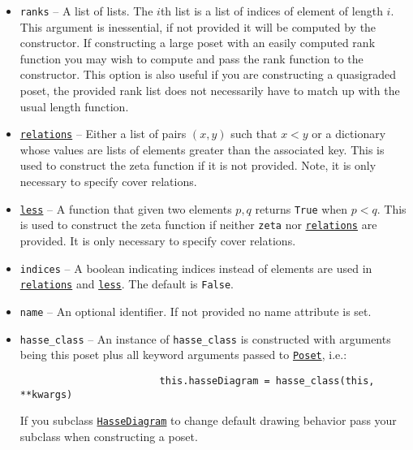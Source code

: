 \documentclass[12pt]{article}
\begin{document}
{{\begin{itemize}
{                The default value is \verb|[0,...,len(zeta)-1]|
                Note, the list will be reordered into a linear extension as this is necessary to store the zeta function as a triangular array.
        }
        \item[]{
        \verb|ranks| -- A list of lists. The $i$th list is a list of indices of element of
                length $i$. This argument is inessential, if not provided it will be computed by the constructor.
                If constructing a large poset with an easily computed
                rank function you may wish to compute and pass the
                rank function to the constructor. This
                option is also useful if you are constructing
                a quasigraded poset, the provided rank list
                does not necessarily have to match up with
                the usual length function.
        }
        \item[]{
        \hyperlink{Poset.relations}{\texttt{relations}} -- Either a list of pairs $(x,y)$ such that $x<y$ or a dictionary
                whose values are lists of elements greater than the associated key.
                This is used to construct the zeta function if it is not provided.
                Note, it is only necessary to specify cover relations.
        }
        \item[]{
        \hyperlink{Poset.less}{\texttt{less}} -- A function that given two elements $p,q$ returns \verb|True| when
                $p < q$. This is used to construct the zeta function if neither \verb|zeta|
                nor \hyperlink{Poset.relations}{\texttt{relations}} are provided. It is only necessary to specify cover relations.
        }
        \item[]{
        \verb|indices| -- A boolean indicating indices instead of elements are used in
                \hyperlink{Poset.relations}{\texttt{relations}} and \hyperlink{Poset.less}{\texttt{less}}. The default is \verb|False|.
        }
        \item[]{
        \verb|name| -- An optional identifier. If not provided no name attribute is set.
        }
        \item[]{
        \verb|hasse_class| -- An instance of \verb|hasse_class| is constructed with arguments being
                this poset plus all keyword arguments passed to \hyperlink{Poset}{\texttt{Poset}}, i.e.:
                        \begin{verbatim}
                        this.hasseDiagram = hasse_class(this, **kwargs)
                        \end{verbatim}
                If you subclass \hyperlink{HasseDiagram}{\texttt{HasseDiagram}} to change default drawing behavior pass
                your subclass when constructing a poset.

}
\end{itemize}}}
\end{document}
